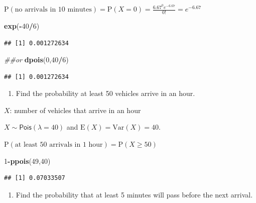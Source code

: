 \documentclass[
]{book}
\newenvironment{Shaded}{\begin{snugshade}}{\end{snugshade}}
\newcommand{\CommentTok}[1]{\textcolor[rgb]{0.56,0.35,0.01}{\textit{#1}}}
\newcommand{\DecValTok}[1]{\textcolor[rgb]{0.00,0.00,0.81}{#1}}
\newcommand{\KeywordTok}[1]{\textcolor[rgb]{0.13,0.29,0.53}{\textbf{#1}}}
\newcommand{\NormalTok}[1]{#1}
\newcommand{\OperatorTok}[1]{\textcolor[rgb]{0.81,0.36,0.00}{\textbf{#1}}}
\providecommand{\tightlist}{%
  \setlength{\itemsep}{0pt}\setlength{\parskip}{0pt}}
\begin{document}
\(\mbox{P}(\mbox{no arrivals in 10 minutes})=\mbox{P}(X=0)=\frac{6.67^0 e^{-6.67}}{0!}=e^{-6.67}\)

\begin{Shaded}
\begin{Highlighting}[]
\KeywordTok{exp}\NormalTok{(}\OperatorTok{-}\DecValTok{40}\OperatorTok{/}\DecValTok{6}\NormalTok{)}
\end{Highlighting}
\end{Shaded}

\begin{verbatim}
## [1] 0.001272634
\end{verbatim}

\begin{Shaded}
\begin{Highlighting}[]
\CommentTok{##or}
\KeywordTok{dpois}\NormalTok{(}\DecValTok{0}\NormalTok{,}\DecValTok{40}\OperatorTok{/}\DecValTok{6}\NormalTok{)}
\end{Highlighting}
\end{Shaded}

\begin{verbatim}
## [1] 0.001272634
\end{verbatim}

\begin{enumerate}
\def\labelenumi{\alph{enumi}.}
\setcounter{enumi}{1}
\tightlist
\item
  Find the probability at least 50 vehicles arrive in an hour.
\end{enumerate}

\(X\): number of vehicles that arrive in an hour

\(X\sim \textsf{Pois}(\lambda=40)\) and \(\mbox{E}(X)=\mbox{Var}(X)=40\).

\(\mbox{P}(\mbox{at least 50 arrivals in 1 hour})=\mbox{P}(X\geq 50)\)

\begin{Shaded}
\begin{Highlighting}[]
\DecValTok{1}\OperatorTok{-}\KeywordTok{ppois}\NormalTok{(}\DecValTok{49}\NormalTok{,}\DecValTok{40}\NormalTok{)}
\end{Highlighting}
\end{Shaded}

\begin{verbatim}
## [1] 0.07033507
\end{verbatim}

\begin{enumerate}
\def\labelenumi{\alph{enumi}.}
\setcounter{enumi}{2}
\tightlist
\item
  Find the probability that at least 5 minutes will pass before the next arrival.
\end{enumerate}
\end{document}
